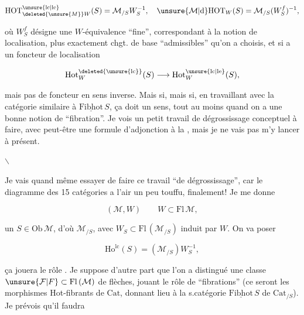 \[
\mathrm{HOT}^{\unsure{\mathrm{lc}|\mathrm{le}}}_{\deleted{\unsure{M}}W}(S)=\mathcal M_{/S}W_S^{-1},\quad
\unsure{\mathcal M|\mathrm{d}}\mathrm{HOT}_{W}(S)=\mathcal M_{/S}(W_S^f)^{-1},
\]

où $W_S^f$ désigne une $W$-équivalence ``fine'', correspondant à la notion de localisation, plus exactement  chgt. de base ``admissibles'' qu'on a choisis, et si  a un foncteur de localisation

\[
\mathrm{Hot}^{\deleted{\unsure{\mathrm{lc}}}}_W(S)\longrightarrow\mathrm{Hot}^{\unsure{\mathrm{lc}|\mathrm{le}}}_W(S),
\]

mais pas de foncteur en sens inverse. Mais si, mais si,  en travaillant avec la catégorie similaire  à $\underline{\mathrm{Fibhot}}\,S$, ça doit  un sens, tout au moins quand on a une bonne notion de ``fibration''. Je vois un petit travail de dégrossissage conceptuel à faire, avec peut-être une formule d'adjonction à la , mais je ne vais pas m'y lancer à présent.

$\backslash$


Je vais quand même essayer de faire ce travail ``de dégrossissage'', car le diagramme des 15 catégories a l'air un peu touffu, finalement! Je me donne

\[
(\mathcal M,W)\qquad W\subset\mathrm{Fl}\,\mathcal M,
\]

un $S\in\mathrm{Ob}\,\mathcal M$, d'où $\mathcal M_{/S}$, avec $W_S\subset\mathrm{Fl}\,(\mathcal M_{/S})$ induit par $W$. On va poser

\[
\mathrm{Ho}^{\mathrm{lc}}(S)=(\mathcal M_{/S})W_S^{-1},
\]

ça jouera le rôle . Je suppose d'autre part que l'on a distingué une classe $\unsure{\mathcal F|F}\subset\mathrm{Fl}\,(\mathcal M)$ de flèches, jouant le rôle de ``fibrations'' (ce seront les morphismes Hot-fibrants de $\mathrm{Cat}$, donnant lieu à la s.catégorie $\underline{\mathrm{Fibhot}}\,S$ de $\mathrm{Cat}_{/S}$). Je prévois qu'il faudra

